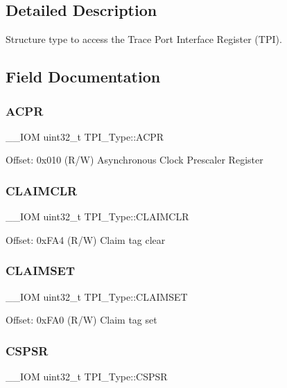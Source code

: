\subsection{Detailed Description}
Structure type to access the Trace Port Interface Register (T\+PI). 

\subsection{Field Documentation}
\mbox{\label{structTPI__Type_a9e5e4421ef9c3d5b7ff8b24abd4e99b3}} 
\subsubsection{\texorpdfstring{ACPR}{ACPR}}
{\footnotesize\ttfamily \+\_\+\+\_\+\+I\+OM uint32\+\_\+t T\+P\+I\+\_\+\+Type\+::\+A\+C\+PR}

Offset\+: 0x010 (R/W) Asynchronous Clock Prescaler Register \mbox{\label{structTPI__Type_a0e10e292cb019a832b03ddd055b2f6ac}} 
\subsubsection{\texorpdfstring{CLAIMCLR}{CLAIMCLR}}
{\footnotesize\ttfamily \+\_\+\+\_\+\+I\+OM uint32\+\_\+t T\+P\+I\+\_\+\+Type\+::\+C\+L\+A\+I\+M\+C\+LR}

Offset\+: 0x\+F\+A4 (R/W) Claim tag clear \mbox{\label{structTPI__Type_af8b7d15fa5252b733dd4b11fa1b5730a}} 
\subsubsection{\texorpdfstring{CLAIMSET}{CLAIMSET}}
{\footnotesize\ttfamily \+\_\+\+\_\+\+I\+OM uint32\+\_\+t T\+P\+I\+\_\+\+Type\+::\+C\+L\+A\+I\+M\+S\+ET}

Offset\+: 0x\+F\+A0 (R/W) Claim tag set \mbox{\label{structTPI__Type_a8826aa84e5806053395a742d38d59d0f}} 
\subsubsection{\texorpdfstring{CSPSR}{CSPSR}}
{\footnotesize\ttfamily \+\_\+\+\_\+\+I\+OM uint32\+\_\+t T\+P\+I\+\_\+\+Type\+::\+C\+S\+P\+SR}

